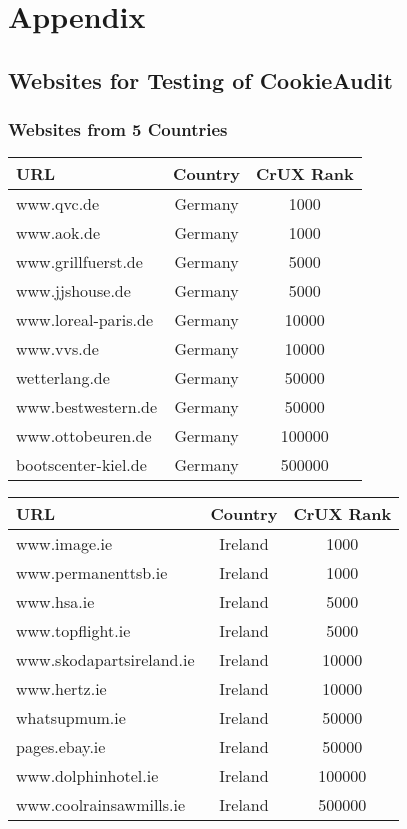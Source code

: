 \chapter{Appendix}

\section{Websites for Testing of CookieAudit}
\subsection{Websites from 5 Countries}

\begin{center}
\begin{tabular}{lcc}
	\toprule
	URL                             & Country & CrUX Rank \\
	\midrule
    www.qvc.de              & Germany & 1000  \\
    www.aok.de              & Germany & 1000  \\
    www.grillfuerst.de      & Germany & 5000  \\
    www.jjshouse.de         & Germany & 5000  \\
    www.loreal-paris.de     & Germany & 10000  \\
    www.vvs.de              & Germany & 10000  \\
    wetterlang.de           & Germany & 50000  \\
    www.bestwestern.de      & Germany & 50000  \\
    www.ottobeuren.de       & Germany & 100000  \\
    bootscenter-kiel.de     & Germany & 500000  \\
	\bottomrule
\end{tabular}
\end{center}

\begin{center}
\begin{tabular}{lcc}
	\toprule
	URL                              & Country & CrUX Rank \\
	\midrule
    www.image.ie             & Ireland & 1000  \\
    www.permanenttsb.ie      & Ireland & 1000  \\
    www.hsa.ie               & Ireland & 5000  \\
    www.topflight.ie         & Ireland & 5000  \\
    www.skodapartsireland.ie & Ireland & 10000  \\
    www.hertz.ie             & Ireland & 10000  \\
    whatsupmum.ie            & Ireland & 50000  \\
    pages.ebay.ie            & Ireland & 50000  \\
    www.dolphinhotel.ie      & Ireland & 100000  \\
    www.coolrainsawmills.ie  & Ireland & 500000  \\
	\bottomrule
\end{tabular}
\end{center}

